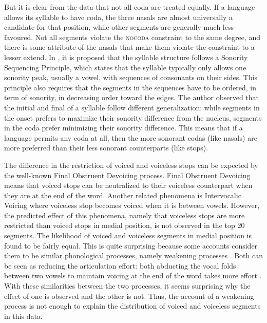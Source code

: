 \par
But it is clear from the data that not all coda are treated equally. 
If a language allows its syllable to have coda, the three nasals are almost universally a candidate for that position, while other segments are generally much less favoured.
Not all segments violate the \textsc{nocoda} constraint to the same degree, and there is some attribute of the nasals that make them violate the constraint to a lesser extend.
In \citet{Clements1990}, it is proposed that the syllable structure follows a Sonority Sequencing Principle, which states that the syllable typically only allows one sonority peak, usually a vowel, with sequences of consonants on their sides.
This principle also requires that the segments in the sequences have to be ordered, in term of sonority, in decreasing order toward the edges.  
The author observed that the initial and final of a syllable follow different generalization: while segments in the onset prefers to maximize their sonority difference from the nucleus, segments in the coda prefer minimizing their sonority difference. 
This means that if a language permits any coda at all, then the more sonorant codas (like nasals) are more preferred than their less sonorant counterparts (like stops).

\par
The difference in the restriction of voiced and voiceless stops can be expected by the well-known Final Obstruent Devoicing process. 
Final Obstruent Devoicing means that voiced stops can be neutralized to their voiceless counterpart when they are at the end of the word. 
Another related phenomena is Intervocalic Voicing where voiceless stop becomes voiced when it is between vowels. 
However, the predicted effect of this phenomena, namely that voiceless stops are more restricted than voiced stops in medial position, is not observed in the top 20 segments.
The likelihood of voiced and voiceless segments in medial position is found to be fairly equal.
This is quite surprising because some accounts consider them to be similar phonological processes, namely weakening processes \citep{Gordon_2016, harris2009final}.
Both can be seen as reducing the articulation effort: both abducting the vocal folds between two vowels to maintain voicing at the end of the word takes more effort \citep{Gordon_2016}. 
With these similarities between the two processes, it seems surprising why the effect of one is observed and the other is not.
Thus, the account of a weakening process is not enough to explain the distribution of voiced and voiceless segments in this data.


